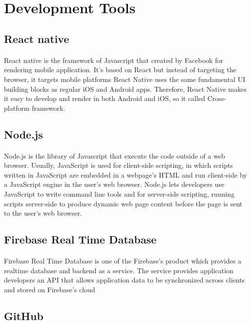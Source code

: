 \section{Development Tools}
\subsection{React native}
\paragraph{}React native is the framework of Javascript that created by Facebook for rendering mobile application. It’s based on React but instead of targeting the browser, it targets mobile platforms React Native uses the same fundamental UI building blocks as regular iOS and Android apps. Therefore, React Native makes it easy to develop and render in both Android and iOS, so it called Cross-platform framework. 
\subsection{Node.js }
\paragraph{}Node.js is the library of Javascript that execute the code outside of a web browser. Usually, JavaScript is used for client-side scripting, in which scripts written in JavaScript are embedded in a webpage's HTML and run client-side by a JavaScript engine in the user's web browser. Node.js lets developers use JavaScript to write command line tools and for server-side scripting, running scripts server-side to produce dynamic web page content before the page is sent to the user's web browser.
\subsection{Firebase Real Time Database}
\paragraph{}Firebase Real Time Database is one of the Firebase's product which provides a realtime database and backend as a service. The service provides application developers an API that allows application data to be synchronized across clients and stored on Firebase's cloud  
\subsection{GitHub}
